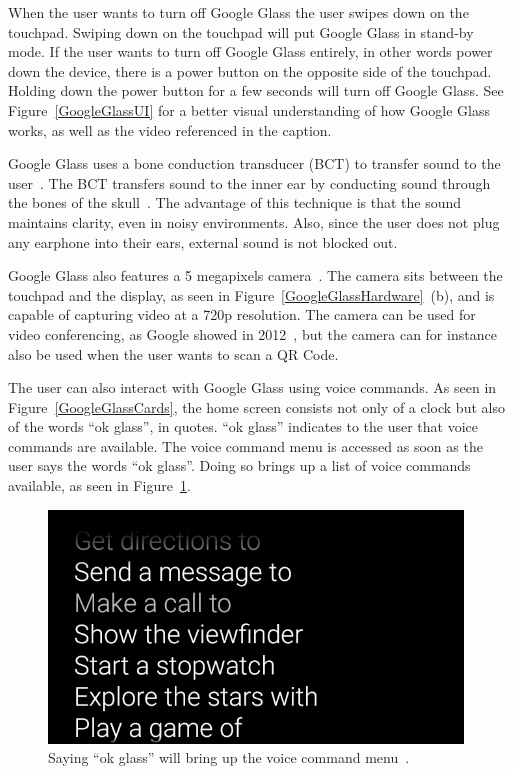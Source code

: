 When the user wants to turn off Google Glass the user swipes down on the touchpad. Swiping down on the touchpad will put Google Glass in stand-by mode. If the user wants to turn off Google Glass entirely, in other words power down the device, there is a power button on the opposite side of the touchpad. Holding down the power button for a few seconds will turn off Google Glass. See Figure~\ref{GoogleGlassUI} for a better visual understanding of how Google Glass works, as well as the video referenced in the caption.

Google Glass uses a bone conduction transducer (BCT) to transfer sound to the user~\cite{GlassSpecs}. The BCT transfers sound to the inner ear by conducting sound through the bones of the skull~\cite{boneConductionWiki}. The advantage of this technique is that the sound maintains clarity, even in noisy environments. Also, since the user does not plug any earphone into their ears, external sound is not blocked out.

Google Glass also features a 5 megapixels camera~\cite{GlassSpecs}. The camera sits between the touchpad and the display, as seen in Figure~\ref{GoogleGlassHardware}~(b), and is capable of capturing video at a 720p resolution. The camera can be used for video conferencing, as Google showed in 2012~\cite{glassLiveDemo}, but the camera can for instance also be used when the user wants to scan a QR Code.

The user can also interact with Google Glass using voice commands. As seen in Figure~\ref{GoogleGlassCards}, the home screen consists not only of a clock but also of the words ``ok glass'', in quotes. ``ok glass'' indicates to the user that voice commands are available. The voice command menu is accessed as soon as the user says the words ``ok glass''. Doing so brings up a list of voice commands available, as seen in Figure~\ref{voiceCommandMenu}.

	\begin{figure}[H]%
		\centering
		\includegraphics[width=110mm]{images/glassVoiceMenu}
		\caption{Saying ``ok glass'' will bring up the voice command menu~\cite{googleGlassVoiceCommand}.}
		\label{voiceCommandMenu}
	\end{figure}

